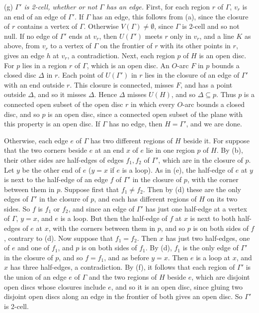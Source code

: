 {\hspace*{12pt}(g) \textit{$\Gamma'$ is 2-cell, whether or not $\Gamma$ has an edge.} First, for each region $r$ of $\Gamma$, $v_r$ is an end of an edge of $\Gamma'$. If $\Gamma$ has an edge, this follows from (a), since the closure of $r$ contains a vertex of $\Gamma$. Otherwise $V(\Gamma) \ne \emptyset$, since $\Gamma$ is 2-cell and so not null. If no edge of $\Gamma'$ ends at $v_r$, then $U(\Gamma')$ meets $r$ only in $v_r$, and a line $K$ as above, from $v_r$ to a vertex of $\Gamma$ on the frontier of $r$ with its other points in $r$, gives an edge $h$ at $v_r$, a contradiction. Next, each region $p$ of $H$ is an open disc. For $p$ lies in a region $r$ of $\Gamma$, which is an open disc. An $O$-arc $F$ in $p$ bounds a closed disc $\Delta$ in $r$. Each point of $U(\Gamma')$ in $r$ lies in the closure of an edge of $\Gamma'$ with an end outside $r$. This closure is connected, misses $F$, and has a point outside $\Delta$, and so it misses $\Delta$. Hence $\Delta$ misses $U(H)$, and so $\Delta \subseteq p$. Thus $p$ is a connected open subset of the open disc $r$ in which every $O$-arc bounds a closed disc, and so $p$ is an open disc, since a connected open subset of the plane with this property is an open disc. If $\Gamma$ has no edge, then $H = \Gamma'$, and we are done.

Otherwise, each edge $e$ of $\Gamma$ has two different regions of $H$ beside it. For suppose that the two corners beside $e$ at an end $x$ of $e$ lie in one region $p$ of $H$. By (b), their other sides are half-edges of edges $f_1, f_2$ of $\Gamma'$, which are in the closure of $p$. Let $y$ be the other end of $e$ ($y = x$ if $e$ is a loop). As in (e), the half-edge of $e$ at $y$ is next to the half-edge of an edge $f$ of $\Gamma'$ in the closure of $p$, with the corner between them in $p$. Suppose first that $f_1 \ne f_2$. Then by (d) these are the only edges of $\Gamma'$ in the closure of $p$, and each has different regions of $H$ on its two sides. So $f$ is $f_1$ or $f_2$, and since an edge of $\Gamma'$ has just one half-edge at a vertex of $\Gamma$, $y = x$, and $e$ is a loop. But then the half-edge of $f$ at $x$ is next to both half-edges of $e$ at $x$, with the corners between them in $p$, and so $p$ is on both sides of $f$, contrary to (d). Now suppose that $f_1 = f_2$. Then $x$ has just two half-edges, one of $e$ and one of $f_1$, and $p$ is on both sides of $f_1$. By (d), $f_1$ is the only edge of $\Gamma'$ in the closure of $p$, and so $f = f_1$, and as before $y = x$. Then $e$ is a loop at $x$, and $x$ has three half-edges, a contradiction. By (f), it follows that each region of $\Gamma'$ is the union of an edge $e$ of $\Gamma$ and the two regions of $H$ beside $e$, which are disjoint open discs whose closures include $e$, and so it is an open disc, since gluing two disjoint open discs along an edge in the frontier of both gives an open disc. So $\Gamma'$ is 2-cell.

}
